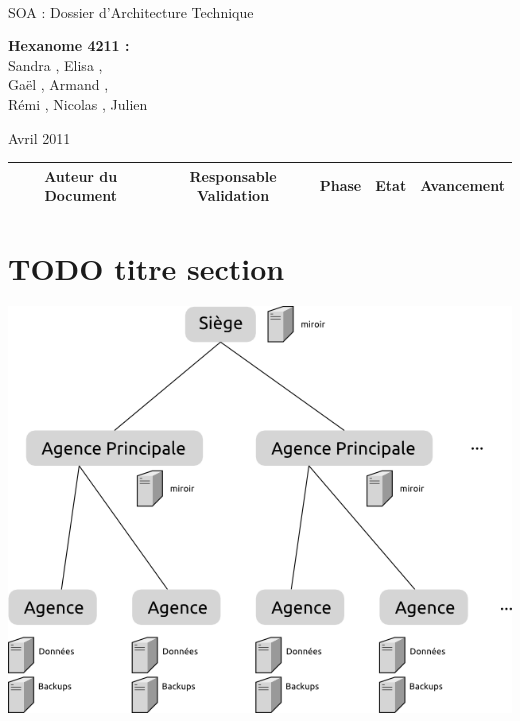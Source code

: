 \documentclass[a4paper]{article}
\begin{document}
\begin{titlepage}
~ 
\vfill
	\begin{center}
		\begin{Huge}
		SOA : Dossier d'Architecture Technique\\
		\end{Huge} 
\vfill
		\textbf{Hexanome 4211 :} 
		\\Sandra {}, Elisa , 
		\\Gaël , Armand , 
		\\Rémi , Nicolas , Julien \\

\vfill		
		\begin{Large}
		Avril 2011
		\end{Large}
\vfill
	\begin{tabular}{|c|c|c|c|c|}
 	 \hline
 	 Auteur du Document & Responsable Validation & Phase & Etat & Avancement \\
 	 \hline
 	 
 	\hline
 	
	\end{tabular}
\vfill	
	\end{center}
\vfill
\end{titlepage}

\newpage
\tableofcontents
\newpage

\section{TODO titre section}

\includegraphics{archi_base.png}
\end{document}
